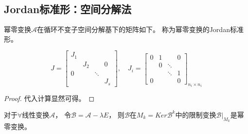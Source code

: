 \subsection{Jordan标准形：空间分解法}



\begin{theorem}[幂零变换的Jordan标准型]
  幂零变换$\mathcal{A}$在循环不变子空间分解基下的矩阵如下。
  称为幂零变换的Jordan标准形。
\end{theorem}

\begin{equation*}
  J=\left[\begin{array}{cccc}
            J_{1} & & & \\
                  & J_{2} & & 0 \\
            0 & & \ddots & \\
                  & & & J_{s}
          \end{array}\right], \quad J_{i}=\left[\begin{array}{cccc}
                                                  0 & 1 & & 0 \\
                                                    & 0 & \ddots & \\
                                                    & & \ddots & 1 \\
                                                  0 & & & 0
                                                \end{array}\right]_{n_{i} \times n_{i}}
\end{equation*}

\begin{proof}
  代入计算显然可得。
\end{proof}

\begin{theorem}[核限制变换是幂零变换]
  对于$\forall$线性变换$\mathcal{A}$，
  令$\mathcal{B} = \mathcal{A} - \lambda E$，
  则$\mathcal{B}$在$M_k = Ker \mathcal{B}^k$中的限制变换$\mathcal{B}|_{M_k}$是幂零变换。
\end{theorem}

